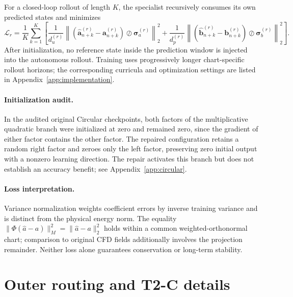 \documentclass{article}
\begin{document}
For a closed-loop rollout of length $K$, the specialist recursively
consumes its own predicted states and minimizes
\begin{equation}
  \mathcal L_r
  =
  \frac{1}{K}
  \sum_{k=1}^{K}
  \left[
    \frac{1}{d_u^{(r)}}
    \left\|
      \left(
        \widehat{\bm a}_{n+k}^{(r)}
        -
        \bm a_{n+k}^{(r)}
      \right)
      \oslash
      \bm\sigma_a^{(r)}
    \right\|_2^2
    +
    \frac{1}{d_p^{(r)}}
    \left\|
      \left(
        \widehat{\bm b}_{n+k}^{(r)}
        -
        \bm b_{n+k}^{(r)}
      \right)
      \oslash
      \bm\sigma_b^{(r)}
    \right\|_2^2
  \right].
  \label{eq:app_true_rollout_loss}
\end{equation}
After initialization, no reference state inside the prediction window is
injected into the autonomous rollout. Training uses progressively longer
chart-specific rollout horizons; the corresponding curricula and
optimization settings are listed in Appendix~\ref{app:implementation}.


\paragraph{Initialization audit.}
In the audited original Circular checkpoints, both factors of the
multiplicative quadratic branch were initialized at zero and remained
zero, since the gradient of either factor contains the other factor.
The repaired configuration retains a random right factor and zeroes only
the left factor, preserving zero initial output with a nonzero learning
direction. The repair activates this branch but does not establish an
accuracy benefit; see Appendix~\ref{app:circular}.

\paragraph{Loss interpretation.}
Variance normalization weights coefficient errors by inverse training
variance and is distinct from the physical energy norm. The equality
$\|\Phi(\widehat a-a)\|_M^2=\|\widehat a-a\|_2^2$ holds within a common
weighted-orthonormal chart; comparison to original CFD fields additionally
involves the projection remainder. Neither loss alone guarantees
conservation or long-term stability.

\section{Outer routing and T2-C details}
\label{app:routing}
\end{document}
